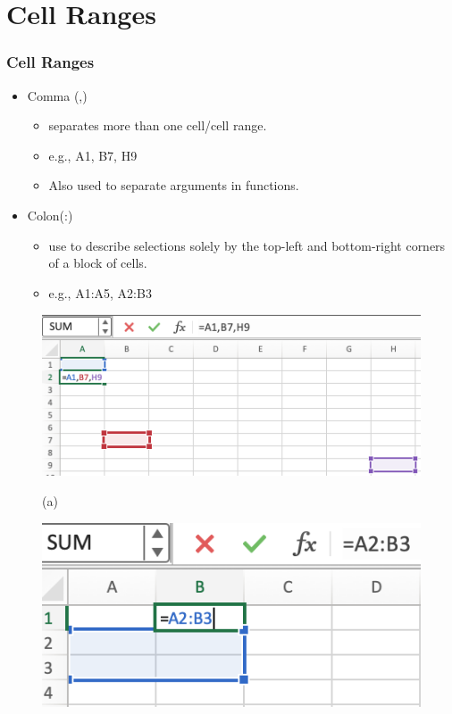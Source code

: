 \documentclass[12pt]{beamer}
\begin{document}
\section{Cell Ranges}
	\begin{frame}
		\frametitle{Cell Ranges}
		\begin{itemize}
			\item Comma (,)
				\begin{itemize}
					\item separates more than one cell/cell range. 
					\item e.g., A1, B7, H9
					\item Also used to separate arguments in functions.
				\end{itemize}
			\item Colon(:)
				\begin{itemize}
					\item use to describe selections solely by the top-left and bottom-right corners of a block of cells. 
					\item e.g., A1:A5, A2:B3
				\end{itemize}
		\end{itemize}
		\begin{figure}[htb]
		\begin{minipage}[t]{0.32\linewidth}\centering
			\includegraphics[width=0.9\linewidth]{selection1.png}
			\medskip
			\centerline{(a)}
		\end{minipage}\hfill
		\begin{minipage}[t]{0.32\linewidth}\centering
			\includegraphics[width=0.9\linewidth]{selection2.png}

\end{minipage}
\end{figure}
\end{frame}
\end{document}
